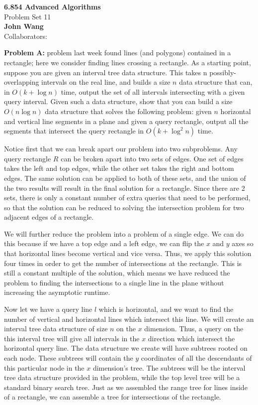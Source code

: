 \documentclass[psamsfonts]{amsart}
\newenvironment{sol}{\vspace{0.25cm}{\large \bfseries Solution:}}{\qedsymbol}
\newenvironment{prob}[1]{\begin{framed}{\large \bfseries Problem #1:}}{\end{framed}}
\newcommand{\makenewtitle}{
    \begin{center}
    {\huge \bfseries 6.854 Advanced Algorithms} \\
    Problem Set 11\\
    \vspace{0.25cm}
    {\bfseries John Wang} \\
    Collaborators:  
    \end{center}
    \vspace{0.5cm}
}
\begin{document}
\newpage
\makenewtitle
\begin{prob}{2}
A problem last week found lines (and polygons) contained in a rectangle; here we consider finding lines crossing a rectangle. As a starting point, suppose you are given an interval tree data structure. This takes n possibly-overlapping intervals on the real line, and builds a size $n$ data structure that can, in $O(k + \log n)$ time, output the set of all intervals intersecting with a given query interval. Given such a data structure, show that you can build a size $O(n \log n)$ data structure that solves the following problem: given $n$ horizontal and vertical line segments in a plane and given a query rectangle, output all the segments that intersect the query rectangle in $O(k + \log^2 n)$ time. 
\end{prob}
\begin{sol}
Notice first that we can break apart our problem into two subproblems. Any query rectangle $R$ can be broken apart into two sets of edges. One set of edges takes the left and top edges, while the other set takes the right and bottom edges. The same solution can be applied to both of these sets, and the union of the two results will result in the final solution for a rectangle. Since there are 2 sets, there is only a constant number of extra queries that need to be performed, so that the solution can be reduced to solving the intersection problem for two adjacent edges of a rectangle.

We will further reduce the problem into a problem of a single edge. We can do this because if we have a top edge and a left edge, we can flip the $x$ and $y$ axes so that horizontal lines become vertical and vice versa. Thus, we apply this solution four times in order to get the number of intersections at the rectangle. This is still a constant multiple of the solution, which means we have reduced the problem to finding the intersections to a single line in the plane without increasing the asymptotic runtime.

Now let we have a query line $l$ which is horizontal, and we want to find the number of vertical and horizontal lines which intersect this line. We will create an interval tree data structure of size $n$ on the $x$ dimension. Thus, a query on the this interval tree will give all intervals in the $x$ direction which intersect the horizontal query line. The data structure we create will have subtrees rooted on each node. These subtrees will contain the $y$ coordinates of all the descendants of this particular node in the $x$ dimension's tree. The subtrees will be the interval tree data structure provided in the problem, while the top level tree will be a standard binary search tree. Just as we assembled the range tree for lines inside of a rectangle, we can assemble a tree for intersections of the rectangle. 


\end{sol}
\end{document}
